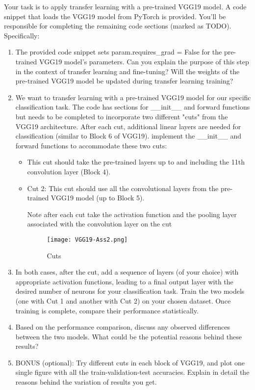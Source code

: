 \documentclass[11pt]{scrartcl}
\begin{document}
Your task is to apply transfer learning with a pre-trained VGG19 model. A code snippet that loads the VGG19 model from PyTorch is provided. You'll be responsible for completing the remaining code sections (marked as TODO). Specifically:

\begin{enumerate}
    \item The provided code snippet sets param.requires\_grad = False for the pre-trained VGG19 model's parameters. Can you explain the purpose of this step in the context of transfer learning and fine-tuning? Will the weights of the pre-trained VGG19 model be updated during transfer learning training?

    \item We want to transfer learning with a pre-trained VGG19 model for our specific classification task. The code has sections for \_\_init\_\_ and forward functions but needs to be completed to incorporate two different "cuts" from the VGG19 architecture. After each cut, additional linear layers are needed for classification (similar to Block 6 of VGG19).
implement the \_\_init\_\_ and forward functions to accommodate these two cuts:
\begin{itemize}
    \item This cut should take the pre-trained layers up to and including the 11th convolution layer (Block 4).

    \item Cut 2: This cut should use all the convolutional layers from the pre-trained VGG19 model (up to Block 5).
    
Note after each cut take the activation function and the pooling layer associated with the convolution layer on the cut

\begin{figure}[th]
\centering
\texttt{[image: VGG19-Ass2.png]}
\caption{Cuts}
\label{fig:scenario}
\end{figure}
\end{itemize}

\item In both cases, after the cut, add a sequence of layers (of your choice) with appropriate activation functions, leading to a final output layer with the desired number of neurons for your classification task.
Train the two models (one with Cut 1 and another with Cut 2) on your chosen dataset. Once training is complete, compare their performance statistically.

\item Based on the performance comparison, discuss any observed differences between the two models. What could be the potential reasons behind these results?

\item BONUS (optional): Try different cuts in each block of VGG19, and plot one single figure with all the train-validation-test accuracies. Explain in detail the reasons behind the variation of results you get.
\end{enumerate}
\end{document}
